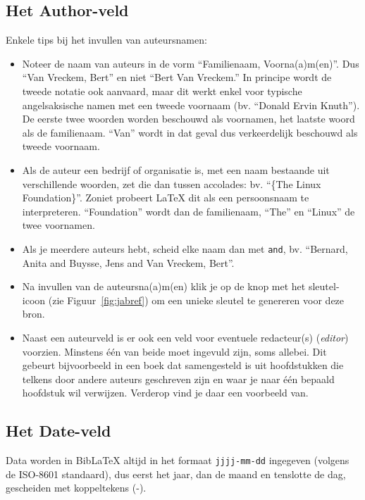 \subsection{Het Author-veld}%
\label{ssec:het_author_veld}

Enkele tips bij het invullen van auteursnamen:

\begin{itemize}
  \item Noteer de naam van auteurs in de vorm ``Familienaam, Voorna(a)m(en)''. Dus ``Van Vreckem, Bert'' en niet ``Bert Van Vreckem.'' In principe wordt de tweede notatie ook aanvaard, maar dit werkt enkel voor typische angelsaksische namen met een tweede voornaam (bv. ``Donald Ervin Knuth''). De eerste twee woorden worden beschouwd als voornamen, het laatste woord als de familienaam. ``Van'' wordt in dat geval dus verkeerdelijk beschouwd als tweede voornaam.
  \item Als de auteur een bedrijf of organisatie is, met een naam bestaande uit verschillende woorden, zet die dan tussen accolades: bv. ``\{The Linux Foundation\}''. Zoniet probeert {\LaTeX} dit als een persoonsnaam te interpreteren. ``Foundation'' wordt dan de familienaam, ``The'' en ``Linux'' de twee voornamen.
  \item Als je meerdere auteurs hebt, scheid elke naam dan met \texttt{and}, bv. ``Bernard, Anita and Buysse, Jens and Van Vreckem, Bert''.
  \item Na invullen van de auteursna(a)m(en) klik je op de knop met het sleutel-icoon (zie Figuur~\ref{fig:jabref}) om een unieke sleutel te genereren voor deze bron.
  \item Naast een auteurveld is er ook een veld voor eventuele redacteur(s) (\emph{editor}) voorzien. Minstens één van beide moet ingevuld zijn, soms allebei. Dit gebeurt bijvoorbeeld in een boek dat samengesteld is uit hoofdstukken die telkens door andere auteurs geschreven zijn en waar je naar één bepaald hoofdstuk wil verwijzen. Verderop vind je daar een voorbeeld van.
\end{itemize}

\subsection{Het Date-veld}%
\label{ssec:het_date_veld}

Data worden in Bib{\LaTeX} altijd in het formaat \texttt{jjjj-mm-dd} ingegeven (volgens de ISO-8601 standaard), dus eerst het jaar, dan de maand en tenslotte de dag, gescheiden met koppeltekens (-).

